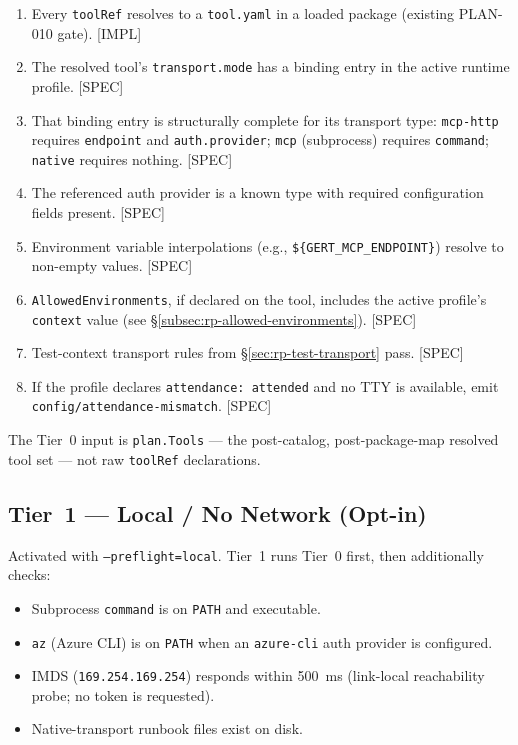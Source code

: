 \begin{enumerate}
  \item Every \texttt{toolRef} resolves to a \texttt{tool.yaml} in a loaded
        package (existing PLAN-010 gate).  [IMPL]
  \item The resolved tool's \texttt{transport.mode} has a binding entry in
        the active runtime profile.  [SPEC]
  \item That binding entry is structurally complete for its transport type:
        \texttt{mcp-http} requires \texttt{endpoint} and
        \texttt{auth.provider}; \texttt{mcp} (subprocess) requires
        \texttt{command}; \texttt{native} requires nothing.  [SPEC]
  \item The referenced auth provider is a known type with required
        configuration fields present.  [SPEC]
  \item Environment variable interpolations (e.g.,
        \texttt{\$\{GERT\_MCP\_ENDPOINT\}}) resolve to non-empty values.
        [SPEC]
  \item \texttt{AllowedEnvironments}, if declared on the tool, includes the
        active profile's \texttt{context} value
        (see \S\ref{subsec:rp-allowed-environments}).  [SPEC]
  \item Test-context transport rules from \S\ref{sec:rp-test-transport}
        pass.  [SPEC]
  \item If the profile declares \texttt{attendance: attended} and no TTY is
        available, emit \texttt{config/attendance-mismatch}.  [SPEC]
\end{enumerate}

The Tier~0 input is \texttt{plan.Tools} — the post-catalog,
post-package-map resolved tool set — not raw \texttt{toolRef} declarations.

\subsection{Tier~1 — Local / No Network (Opt-in)}
\label{subsec:rp-preflight-t1}

Activated with \texttt{--preflight=local}.  Tier~1 runs Tier~0 first, then
additionally checks:

\begin{itemize}[noitemsep]
  \item Subprocess \texttt{command} is on \texttt{PATH} and executable.
  \item \texttt{az} (Azure CLI) is on \texttt{PATH} when an
        \texttt{azure-cli} auth provider is configured.
  \item IMDS (\texttt{169.254.169.254}) responds within 500~ms
        (link-local reachability probe; no token is requested).
  \item Native-transport runbook files exist on disk.
\end{itemize}

